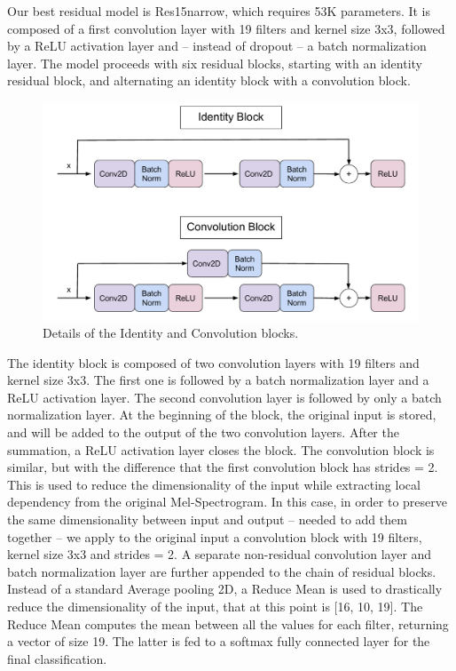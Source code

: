Our best residual model is Res15narrow, which requires 53K parameters.
It is composed of a first convolution layer with 19 filters and kernel size 3x3, followed by a ReLU activation layer and -- instead of dropout -- a batch normalization layer. 
The model proceeds with six residual blocks, starting with an identity residual block, and alternating an identity block with a convolution block.
\begin{figure}[htbp]
\centerline{\includegraphics[scale=.47]{Identity_Conv_blocks.pdf}}
\caption{Details of the Identity and Convolution blocks.}
\label{fig}
\end{figure}
The identity block is composed of two convolution layers with 19 filters and kernel size 3x3. The first one is followed by a batch normalization layer and a ReLU activation layer. The second convolution layer is followed by only a batch normalization layer. At the beginning of the block, the original input is stored, and will be added to the output of the two convolution layers. After the summation, a ReLU activation layer closes the block.
The convolution block is similar, but with the difference that the first convolution block has strides = 2. This is used to reduce the dimensionality of the input while extracting local dependency from the original Mel-Spectrogram.
In this case, in order to preserve the same dimensionality between input and output -- needed to add them together -- we apply to the original input a convolution block with 19 filters, kernel size 3x3 and strides = 2.
A separate non-residual convolution layer and batch normalization layer are further appended to the chain of residual blocks. Instead of a standard Average pooling 2D, a Reduce Mean is used to drastically reduce the dimensionality of the input, that at this point is [16, 10, 19]. The Reduce Mean computes the mean between all the values for each filter, returning a vector of size 19. The latter is fed to a softmax fully connected layer for the final classification.
